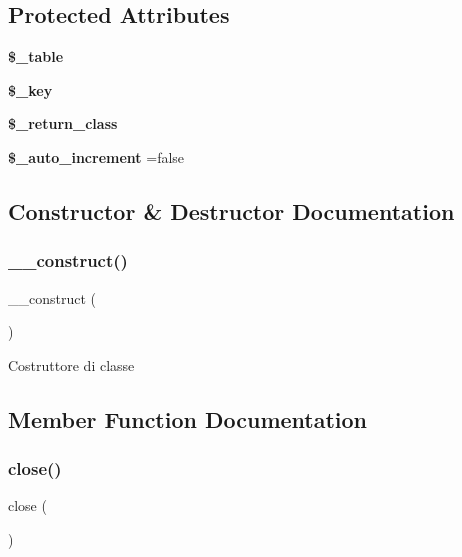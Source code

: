 \subsection*{Protected Attributes}
\begin{DoxyCompactItemize}
\item 
\mbox{\label{class_fdb_ac0ee5b766d19cb282552a3449a1f8376}} 
{\bfseries \$\+\_\+table}
\item 
\mbox{\label{class_fdb_a535630cefaf93746423d63a93daa1099}} 
{\bfseries \$\+\_\+key}
\item 
\mbox{\label{class_fdb_a711573d2afd5aa603ad321a2a01aef22}} 
{\bfseries \$\+\_\+return\+\_\+class}
\item 
\mbox{\label{class_fdb_a254e19e7eb0ccbf400b6458b3dea3f75}} 
{\bfseries \$\+\_\+auto\+\_\+increment} =false
\end{DoxyCompactItemize}


\subsection{Constructor \& Destructor Documentation}
\mbox{\label{class_fdb_a095c5d389db211932136b53f25f39685}} 
\subsubsection{\texorpdfstring{\+\_\+\+\_\+construct()}{\_\_construct()}}
{\footnotesize\ttfamily \+\_\+\+\_\+construct (\begin{DoxyParamCaption}{ }\end{DoxyParamCaption})}

Costruttore di classe 

\subsection{Member Function Documentation}
\mbox{\label{class_fdb_aa69c8bf1f1dcf4e72552efff1fe3e87e}} 
\subsubsection{\texorpdfstring{close()}{close()}}
{\footnotesize\ttfamily close (\begin{DoxyParamCaption}{ }\end{DoxyParamCaption})}

